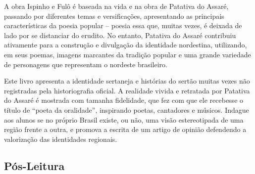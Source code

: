 \documentclass[12pt]{extarticle}
\begin{document}

A obra Ispinho e Fulô é baseada na vida e na obra de
Patativa do Assaré, passando por diferentes temas e versificações,
apresentando as principais características da poesia popular -- poesia
essa que, muitas vezes, é deixada de lado por se distanciar do erudito.
No entanto, Patativa do Assaré contribuiu ativamente para a construção e
divulgação da identidade nordestina, utilizando, em seus poemas, imagens
marcantes da tradição popular e uma grande variedade de personagens que
representam o nordeste brasileiro.

Este livro apresenta a identidade sertaneja e histórias do sertão muitas
vezes não registradas pela historiografia oficial. A realidade vivida e
retratada por Patativa do Assaré é mostrada com tamanha fidelidade, que
fez com que ele recebesse o título de ``poeta da oralidade'', inspirando
poetas, cantadores e músicos. Indague aos alunos se no próprio Brasil
existe, ou não, uma visão estereotipada de uma região frente a outra, e
promova a escrita de um artigo de opinião defendendo a valorização das
identidades regionais.

\subsection{Pós-Leitura}
\end{document}
